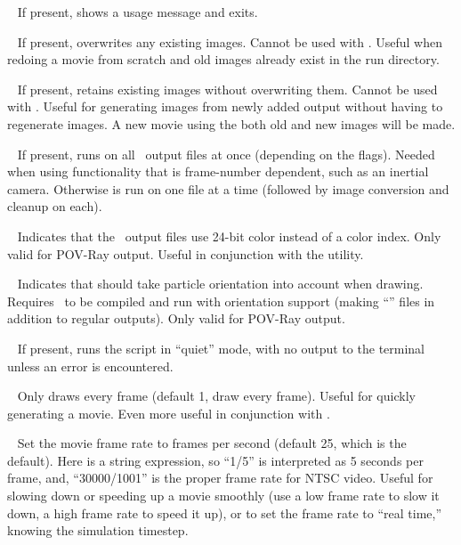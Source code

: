 \begin{description}
\item{} ~ If present, shows a usage message and exits.
\item{} ~ If present, overwrites any existing images.
  Cannot be used with .  Useful when redoing a movie from
  scratch and old images already exist in the run directory.
\item{} ~ If present, retains existing images without
  overwriting them.  Cannot be used with .  Useful for
  generating images from newly added output without having to
  regenerate images.  A new movie using the both old and new images
  will be made.
\item{} ~ If present, runs  on all
  \pkd\ output files at once (depending on the 
  flags).  Needed when using  functionality that is
  frame-number dependent, such as an inertial camera.  Otherwise
   is run on one file at a time (followed by image
  conversion and cleanup on each).
\item{} ~ Indicates that the \pkd\ output files use
  24-bit color instead of a color index.  Only valid for POV-Ray
  output.  Useful in conjunction with the  utility.
\item{} ~ Indicates that  should take
  particle orientation into account when drawing.  Requires \pkd\ to
  be compiled and run with orientation support (making ``''
  files in addition to regular outputs).  Only valid for POV-Ray
  output.
\item{} ~ If present, runs the script in ``quiet'' mode,
  with no output to the terminal unless an error is encountered.
\item{} ~ Only draws every  frame
  (default 1, \ie draw every frame).  Useful for quickly generating a
  movie.  Even more useful in conjunction with .
\item{} ~ Set the movie frame rate to 
  frames per second (default 25, which is the  default).
  Here  is a string expression, so ``1/5'' is interpreted
  as 5 seconds per frame, and, \eg ``30000/1001'' is the proper frame
  rate for NTSC video.  Useful for slowing down or speeding up a movie
  smoothly (use a low frame rate to slow it down, a high frame rate to
  speed it up), or to set the frame rate to ``real time,'' knowing the
  simulation timestep.
\end{description}

